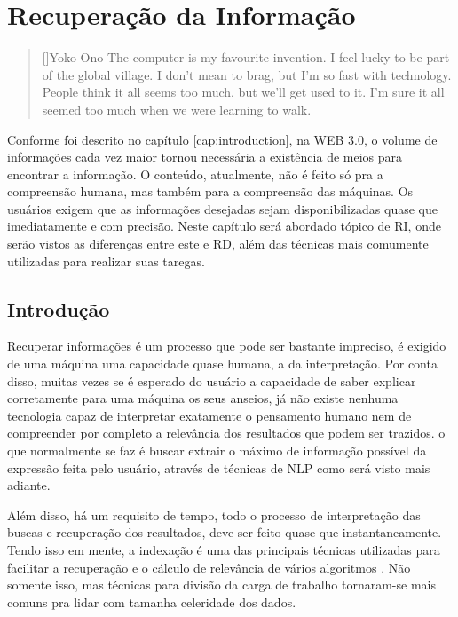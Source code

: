 \chapter{Recuperação da Informação}
\label{cap:informationretrieval}

\begin{quotation}[]{Yoko Ono}
The computer is my favourite invention. I feel lucky to be part of the global village. I don't mean to brag, but I'm so fast with technology. People think it all seems too much, but we'll get used to it. I'm sure it all seemed too much when we were learning to walk.
\end{quotation}

Conforme foi descrito no capítulo \ref{cap:introduction}, na WEB 3.0, o volume de informações cada vez maior tornou necessária a existência de meios para encontrar a informação. O conteúdo, atualmente, não é feito só pra a compreensão humana, mas também para a compreensão das máquinas. Os usuários exigem que as informações desejadas sejam disponibilizadas quase que imediatamente e com precisão. Neste capítulo será abordado tópico de \ac{RI}, onde serão vistos as diferenças entre este e \ac{RD}, além das técnicas mais comumente utilizadas para realizar suas taregas.

\section{Introdução}
Recuperar informações é um processo que pode ser bastante impreciso, é exigido de uma máquina uma capacidade quase humana, a da interpretação. Por conta disso, muitas vezes se é esperado do usuário a capacidade de saber explicar corretamente para uma máquina os seus anseios, já não existe nenhuma tecnologia capaz de interpretar exatamente o pensamento humano nem de compreender por completo a relevância dos resultados que podem ser trazidos. o que normalmente se faz é buscar extrair o máximo de informação possível da expressão feita pelo usuário, através de técnicas de \ac{NLP} como será visto mais adiante.

Além disso, há um requisito de tempo, todo o processo de interpretação das buscas e recuperação dos resultados, deve ser feito quase que instantaneamente. Tendo isso em mente, a indexação é uma das principais técnicas utilizadas para facilitar a recuperação e o cálculo de relevância de vários algoritmos \cite{Fred2008}. Não somente isso, mas técnicas para divisão da carga de trabalho tornaram-se mais comuns pra lidar com tamanha celeridade dos dados.


